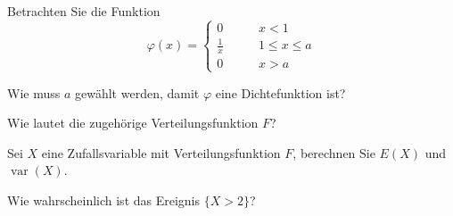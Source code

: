 Betrachten Sie die Funktion
\[
\varphi(x)=\begin{cases}
0&\qquad x < 1\\
\frac1x&\qquad 1\le x\le a\\
0&\qquad x > a
\end{cases}
\]
\begin{teilaufgaben}
\item Wie muss $a$ gewählt werden, damit $\varphi$ eine Dichtefunktion
ist?
\item Wie lautet die zugehörige Verteilungsfunktion $F$?
\item Sei $X$ eine Zufallsvariable mit Verteilungsfunktion $F$, berechnen Sie
$E(X)$ und $\operatorname{var}(X)$.
\item Wie wahrscheinlich ist das Ereignis $\{X>2\}$?
\end{teilaufgaben}

